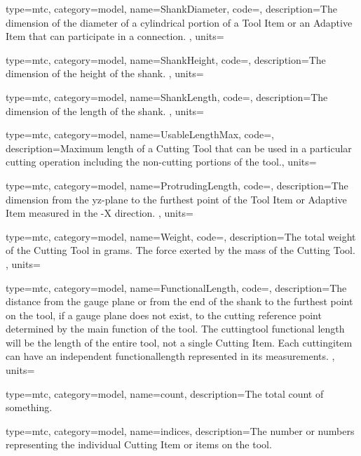 {
  type=mtc,
  category=model,
  name={ShankDiameter},
  code=,
  description={The dimension of the diameter of a cylindrical portion of a Tool Item or an Adaptive Item that can participate in a connection. },
  units=
}


{
  type=mtc,
  category=model,
  name={ShankHeight},
  code=,
  description={The dimension of the height of the shank. },
  units=
}


{
  type=mtc,
  category=model,
  name={ShankLength},
  code=,
  description={The dimension of the length of the shank. },
  units=
}


{
  type=mtc,
  category=model,
  name={UsableLengthMax},
  code=,
  description={Maximum length of a Cutting Tool that can be used in a particular cutting operation including the non-cutting portions of the tool.},
  units=
}


{
  type=mtc,
  category=model,
  name={ProtrudingLength},
  code=,
  description={The dimension from the yz-plane to the furthest point of the Tool Item or Adaptive Item measured in the -X direction. },
  units=
}


{
  type=mtc,
  category=model,
  name={Weight},
  code=,
  description={The total weight of the Cutting Tool in grams. The force exerted by the mass of the Cutting Tool. },
  units=
}


{
  type=mtc,
  category=model,
  name={FunctionalLength},
  code=,
  description={The distance from the gauge plane or from the end of the shank to the furthest point on the tool, if a gauge plane does not exist, to the cutting reference point determined by the main function of the tool. The \gls{cuttingtool} functional length will be the length of the entire tool, not a single Cutting Item. Each \gls{cuttingitem} can have an independent \gls{functionallength} represented in its measurements. },
  units=
}


{
  type=mtc,
  category=model,
  name={count},
  description={The total count of something.}
}


{
  type=mtc,
  category=model,
  name={indices},
  description={The number or numbers representing the individual Cutting Item or items on the tool. }
}


